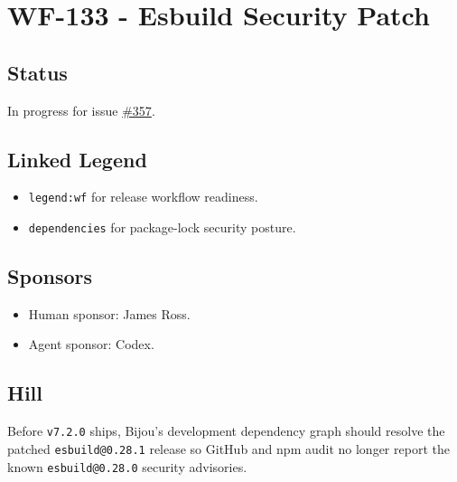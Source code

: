 \chapter{WF-133 - Esbuild Security Patch}\label{record-215}

\smallskip

\section{Status}\label{record-215-status}

In progress for issue \href{https://github.com/flyingrobots/bijou/issues/357}{\#357}.

\section{Linked Legend}\label{record-215-linked-legend}

\begin{itemize}
\tightlist
\item
  \texttt{l\allowbreak{}e\allowbreak{}g\allowbreak{}e\allowbreak{}n\allowbreak{}d\allowbreak{}:\allowbreak{}w\allowbreak{}f} for release workflow readiness.
\item
  \texttt{d\allowbreak{}e\allowbreak{}p\allowbreak{}e\allowbreak{}n\allowbreak{}d\allowbreak{}e\allowbreak{}n\allowbreak{}c\allowbreak{}i\allowbreak{}e\allowbreak{}s} for package-lock security posture.
\end{itemize}

\section{Sponsors}\label{record-215-sponsors}

\begin{itemize}
\tightlist
\item
  Human sponsor: James Ross.
\item
  Agent sponsor: Codex.
\end{itemize}

\section{Hill}\label{record-215-hill}

Before \texttt{v\allowbreak{}7\allowbreak{}.\allowbreak{}2\allowbreak{}.\allowbreak{}0} ships, Bijou's development dependency graph should resolve the patched \texttt{e\allowbreak{}s\allowbreak{}b\allowbreak{}u\allowbreak{}i\allowbreak{}l\allowbreak{}d\allowbreak{}@\allowbreak{}0\allowbreak{}.\allowbreak{}2\allowbreak{}8\allowbreak{}.\allowbreak{}1} release so GitHub and npm audit no longer report the known \texttt{e\allowbreak{}s\allowbreak{}b\allowbreak{}u\allowbreak{}i\allowbreak{}l\allowbreak{}d\allowbreak{}@\allowbreak{}0\allowbreak{}.\allowbreak{}2\allowbreak{}8\allowbreak{}.\allowbreak{}0} security advisories.

